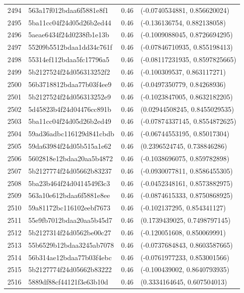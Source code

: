 \begin{table}[ht]
\begin{tabular}{rlrl}
  2494 & 563a17f012bdaa6f5881e8f1 & 0.46 & (-0.0740534881, 0.856620024) \\ 
  2495 & 5ba11cc04f24d05d26b2ed44 & 0.46 & (-0.136136754, 0.882138058) \\ 
  2496 & 5aeae6434f24d0238fb1e13b & 0.46 & (-0.1009088045, 0.8726694295) \\ 
  2497 & 55209b5512bdaa1dd34c761f & 0.46 & (-0.07846710935, 0.855198413) \\ 
  2498 & 55314ef112bdaa5fc17796a5 & 0.46 & (-0.08117231935, 0.8597825665) \\ 
  2499 & 5b2127524f24d056313252f2 & 0.46 & (-0.100309537, 0.863117271) \\ 
  2500 & 56b3718812bdaa77b03f4ee9 & 0.46 & (-0.0497350779, 0.84268936) \\ 
  2501 & 5b2127524f24d056313252e9 & 0.46 & (-0.1023847005, 0.8632182205) \\ 
  2502 & 5d45823b4f24d04476cc891b & 0.46 & (0.02944508245, 0.8455029535) \\ 
  2503 & 5ba11cc04f24d05d26b2ed49 & 0.46 & (-0.07874337145, 0.8554872625) \\ 
  2504 & 59ad36adbc116129d841cbdb & 0.46 & (-0.06744553195, 0.85017304) \\ 
  2505 & 59da63984f24d05b515a1e62 & 0.46 & (0.2396524745, 0.738846286) \\ 
  2506 & 5602818e12bdaa20aa5b4872 & 0.46 & (-0.1038696075, 0.859782898) \\ 
  2507 & 5b2127774f24d05662b83237 & 0.46 & (-0.0930077811, 0.8586455305) \\ 
  2508 & 5ba23b464f24d0414549f3c3 & 0.46 & (-0.0452348161, 0.8573882975) \\ 
  2509 & 563a10e612bdaa6f5881e8ee & 0.46 & (-0.0874615333, 0.8750868925) \\ 
  2510 & 59a81172bc116102eebf7673 & 0.46 & (-0.102137295, 0.854341127) \\ 
  2511 & 55e9fb7012bdaa20aa5b45d7 & 0.46 & (0.1739439025, 0.7498797145) \\ 
  2512 & 5b2127314f24d0562be00c27 & 0.46 & (-0.120051608, 0.850069991) \\ 
  2513 & 55b6529b12bdaa3245ab7078 & 0.46 & (-0.0737684843, 0.8603587665) \\ 
  2514 & 56b314ae12bdaa77b03f4ebc & 0.46 & (-0.0761977233, 0.853001566) \\ 
  2515 & 5b2127774f24d05662b83222 & 0.46 & (-0.100439002, 0.8640793935) \\ 
  2516 & 5889df88cf44121f3e63b10d & 0.46 & (0.3334164645, 0.607504013) \\ 

\end{tabular}
\end{table}
